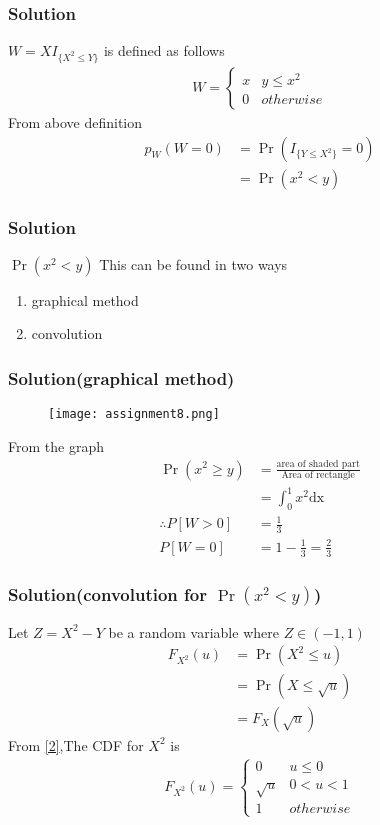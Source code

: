 \documentclass{beamer}
\begin{document}
\begin{frame}
\frametitle{Solution}
$W=XI_{\{X^2 \leq Y\}}$ is defined as follows
\begin{align}
W  = 
\begin{cases}
    x & y \leq x^2 \\
    0 & otherwise
\end{cases}  \label{6}
\end{align}
From above definition
\begin{align}
p_W(W=0) &= \Pr(I_{\{Y\leq X^2\}}=0) \\
         &=\Pr(x^2 <y) \label{7}
\end{align}
\end{frame}
\begin{frame}
\frametitle{Solution}
\begin{block}{$\Pr(x^2<y)$}
This can be found in two ways\\
\begin{enumerate}
\item graphical method
\item convolution
\end{enumerate}
\end{block}
\end{frame}
\begin{frame}
\frametitle{Solution(graphical method)}
\begin{figure}[htb!]
\begin{center}
\texttt{[image: assignment8.png]}
\end{center}
\end{figure}
From the graph
\begin{align}
\Pr(x^2 \geq y)&= \frac{\mbox{area of shaded part}}{\mbox{Area of rectangle}}\\
               &= \int_{0}^{1} x^2 \mathrm{dx} \\
\therefore P[W>0]&=\frac{1}{3} \\
P[W=0]&=1-\frac{1}{3}=\frac{2}{3} 
\end{align}
\end{frame}
\begin{frame}
\frametitle{Solution(convolution for $\Pr(x^2<y)$)}
Let $Z=X^2-Y$ be a random variable where $Z \in (-1,1)$
\begin{align}
F_{X^2}(u)&= \Pr(X^2 \leq u) \\
          &= \Pr(X \leq \sqrt{u}) \\
          &= F_X(\sqrt{u}) \label{8}
\end{align}
From \eqref{2},The CDF for $X^2$ is
\begin{align}
F_{X^2}(u)  = 
\begin{cases}
      0 & u \leq 0 \\
      \sqrt{u} & 0 < u < 1 \\
      1 & otherwise
\end{cases} \label{9}
\end{align}
\end{frame}
\end{document}
